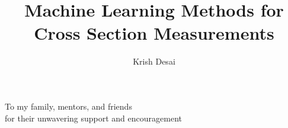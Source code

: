 \documentclass{ucbthesis}
\begin{document}
\title{Machine Learning Methods for Cross Section Measurements}
\author{Krish Desai}
\maketitle
\copyrightpage



\begin{frontmatter}

\begin{dedication}
\null\vfil
\begin{center}
To my family, mentors, and friends\\
\vspace{12pt}
for their unwavering support and encouragement
\end{center}
\vfil\null
\end{dedication}
\clearpage

\tableofcontents
\clearpage

\listoffigures
\clearpage

\listoftables
\clearpage


\end{frontmatter}

\pagestyle{headings}








%

%

\end{document}
